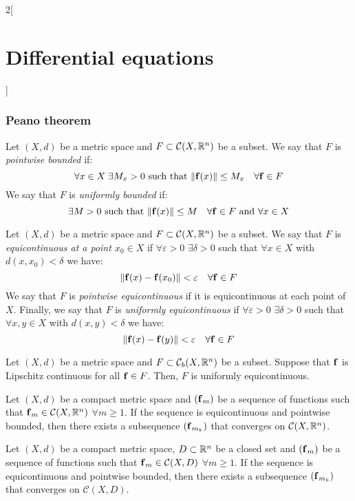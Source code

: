 \documentclass[../../../main.tex]{subfiles}
\begin{document}
\begin{multicols}{2}[\section{Differential equations}]
  \subsubsection{Peano theorem}
  \begin{definition}
    Let $(X,d)$ be a metric space and $F\subset\mathcal{C}(X,\mathbb{R}^n)$ be a subset. We say that $F$ is \textit{pointwise bounded} if: $$\forall x\in X\;\exists M_x>0\text{ such that }\|\boldsymbol{\mathrm{f}}(x)\|\leq M_x\quad\forall\boldsymbol{\mathrm{f}}\in F$$
    We say that $F$ is \textit{uniformly bounded} if: $$\exists M>0\text{ such that }\|\boldsymbol{\mathrm{f}}(x)\|\leq M \quad\forall\boldsymbol{\mathrm{f}}\in F\text{ and }\forall x\in X$$
  \end{definition}
  \begin{definition}
    Let $(X,d)$ be a metric space and $F\subset\mathcal{C}(X,\mathbb{R}^n)$ be a subset. We say that $F$ is \textit{equicontinuous at a point $x_0\in X$} if $\forall \varepsilon>0$ $\exists \delta>0$ such that $\forall x\in X$ with $d(x,x_0)<\delta$ we have: $$\|\boldsymbol{\mathrm{f}}(x)-\boldsymbol{\mathrm{f}}(x_0)\|<\varepsilon\quad\forall\boldsymbol{\mathrm{f}}\in F$$
    We say that $F$ is \textit{pointwise equicontinuous} if it is equicontinuous at each point of $X$. Finally, we say that $F$ is \textit{uniformly equicontinuous} if $\forall \varepsilon>0$ $\exists \delta>0$ such that $\forall x,y\in X$ with $d(x,y)<\delta$ we have: $$\|\boldsymbol{\mathrm{f}}(x)-\boldsymbol{\mathrm{f}}(y)\|<\varepsilon\quad\forall\boldsymbol{\mathrm{f}}\in F$$
  \end{definition}
  \begin{prop}
    Let $(X,d)$ be a metric space and $F\subset\mathcal{C}_b(X,\mathbb{R}^n)$ be a subset. Suppose that $\boldsymbol{\mathrm{f}}$ is Lipschitz continuous for all $\boldsymbol{\mathrm{f}}\in F$. Then, $F$ is uniformly equicontinuous.
  \end{prop}
  \begin{theorem}
    Let $(X,d)$ be a compact metric space and $(\boldsymbol{\mathrm{f}}_m)$ be a sequence of functions such that $\boldsymbol{\mathrm{f}}_m\in\mathcal{C}(X,\mathbb{R}^n)$ $\forall m\geq 1$. If the sequence is equicontinuous and pointwise bounded, then there exists a subsequence $(\boldsymbol{\mathrm{f}}_{m_k})$ that converges on $\mathcal{C}(X,\mathbb{R}^n)$.
  \end{theorem}
  \begin{corollary}
    Let $(X,d)$ be a compact metric space, $D\subset\mathbb{R}^n$ be a closed set and $(\boldsymbol{\mathrm{f}}_m)$ be a sequence of functions such that $\boldsymbol{\mathrm{f}}_m\in\mathcal{C}(X,D)$ $\forall m\geq 1$. If the sequence is equicontinuous and pointwise bounded, then there exists a subsequence $(\boldsymbol{\mathrm{f}}_{m_k})$ that converges on $\mathcal{C}(X,D)$.

\end{corollary}
\end{multicols}
\end{document}
